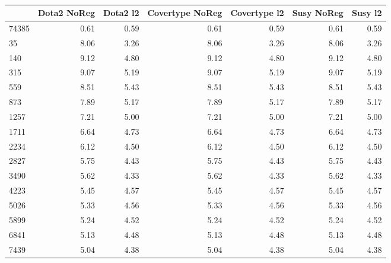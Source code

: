 \begin{table}
\centering
\caption{}
\label{}
\begin{tabular}{lrrrrrr}
\toprule
{} &  Dota2 NoReg &  Dota2 l2 &  Covertype NoReg &  Covertype l2 &  Susy NoReg &  Susy l2 \\
\midrule
74385 &         0.61 &      0.59 &             0.61 &          0.59 &        0.61 &     0.59 \\
35    &         8.06 &      3.26 &             8.06 &          3.26 &        8.06 &     3.26 \\
140   &         9.12 &      4.80 &             9.12 &          4.80 &        9.12 &     4.80 \\
315   &         9.07 &      5.19 &             9.07 &          5.19 &        9.07 &     5.19 \\
559   &         8.51 &      5.43 &             8.51 &          5.43 &        8.51 &     5.43 \\
873   &         7.89 &      5.17 &             7.89 &          5.17 &        7.89 &     5.17 \\
1257  &         7.21 &      5.00 &             7.21 &          5.00 &        7.21 &     5.00 \\
1711  &         6.64 &      4.73 &             6.64 &          4.73 &        6.64 &     4.73 \\
2234  &         6.12 &      4.50 &             6.12 &          4.50 &        6.12 &     4.50 \\
2827  &         5.75 &      4.43 &             5.75 &          4.43 &        5.75 &     4.43 \\
3490  &         5.62 &      4.33 &             5.62 &          4.33 &        5.62 &     4.33 \\
4223  &         5.45 &      4.57 &             5.45 &          4.57 &        5.45 &     4.57 \\
5026  &         5.33 &      4.56 &             5.33 &          4.56 &        5.33 &     4.56 \\
5899  &         5.24 &      4.52 &             5.24 &          4.52 &        5.24 &     4.52 \\
6841  &         5.13 &      4.48 &             5.13 &          4.48 &        5.13 &     4.48 \\
7439  &         5.04 &      4.38 &             5.04 &          4.38 &        5.04 &     4.38 \\
\bottomrule
\end{tabular}
\end{table}
